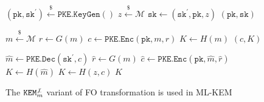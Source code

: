 \documentclass[letterpaper,12pt,titlepage,oneside,final]{book}
\newcommand{\keygen}{\texttt{KeyGen}}
\newcommand{\kem}{\texttt{KEM}}
\newcommand{\encap}{\texttt{Encap}}
\newcommand{\decap}{\texttt{Decap}}
\newcommand{\pk}{\texttt{pk}}
\newcommand{\sk}{\texttt{sk}}
\newcommand{\leftsample}{\stackrel{\$}{\leftarrow}}
\begin{document}
\begin{figure}[htbp]
    \centering

    \begin{minipage}[t]{0.34\textwidth}
        \begin{algorithm}[H]
            \caption*{$\kem^{\not\bot}_m.\keygen()$}
            \begin{algorithmic}[1]
                \State $(\pk, \sk^\prime) \leftsample \texttt{PKE.KeyGen}()$
                \State $z \leftsample \mathcal{M}$
                \State $\sk \leftarrow (\sk^\prime, \pk, z)$
                \State \Return $(\pk, \sk)$
            \end{algorithmic}
        \end{algorithm}
    \end{minipage}
    \begin{minipage}[t]{0.3\textwidth}
        \begin{algorithm}[H]
            \caption*{$\kem^{\not\bot}_m.\encap(\pk)$}
            \begin{algorithmic}[1]
                \State $m \leftsample \mathcal{M}$
                \State $r \leftarrow G(m)$
                \State $c \leftarrow \texttt{PKE.Enc}(\pk, m ,r)$
                \State $K \leftarrow H(m)$
                \State \Return $(c, K)$
            \end{algorithmic}
        \end{algorithm}
    \end{minipage}
    \begin{minipage}[t]{0.3\textwidth}
        \begin{algorithm}[H]
            \caption*{$\kem^{\not\bot}_m.\decap(\sk, c)$}
            \begin{algorithmic}[1]
                \State $\hat{m} \leftarrow \texttt{PKE.Dec}(\sk^\prime, c)$
                \State $\hat{r} \leftarrow G(m)$
                \State $\hat{c} \leftarrow \texttt{PKE.Enc}(\pk, \hat{m}, \hat{r})$
                    \State $K \leftarrow H(\hat{m})$
                \Else
                    \State $K \leftarrow H(z, c)$
                \EndIf
                \State \Return $K$
            \end{algorithmic}
        \end{algorithm}
    \end{minipage}

    \caption{The $\kem^{\not\bot}_m$ variant of FO transformation \cite{DBLP:conf/tcc/HofheinzHK17} is used in ML-KEM}\label{fig:u-notbot-m-routines}
\end{figure}
\end{document}
